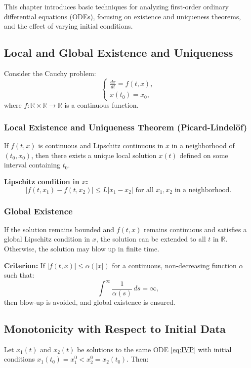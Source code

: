 
This chapter introduces basic techniques for analyzing first-order ordinary differential equations (ODEs), focusing on existence and uniqueness theorems, and the effect of varying initial conditions.

\subsection*{Local and Global Existence and Uniqueness}
Consider the Cauchy problem:
\begin{equation} \label{eq:IVP}
\begin{cases}
\displaystyle \frac{dx}{dt} = f(t, x), \\
x(t_0) = x_0,
\end{cases}
\end{equation}
where $f: \mathbb{R} \times \mathbb{R} \to \mathbb{R}$ is a continuous function.

\subsubsection*{Local Existence and Uniqueness Theorem (Picard-Lindel\"of)}
If $f(t, x)$ is continuous and Lipschitz continuous in $x$ in a neighborhood of $(t_0, x_0)$, then there exists a unique local solution $x(t)$ defined on some interval containing $t_0$.

\textbf{Lipschitz condition in $x$:}
\[|f(t, x_1) - f(t, x_2)| \leq L |x_1 - x_2| \text{ for all } x_1, x_2 \text{ in a neighborhood.}\]

\subsubsection*{Global Existence}
If the solution remains bounded and $f(t,x)$ remains continuous and satisfies a global Lipschitz condition in $x$, the solution can be extended to all $t$ in $\mathbb{R}$. Otherwise, the solution may blow up in finite time.

\textbf{Criterion:} If $|f(t,x)| \leq \alpha(|x|)$ for a continuous, non-decreasing function $\alpha$ such that:
\[\int^\infty \frac{1}{\alpha(s)}\, ds = \infty,\]
then blow-up is avoided, and global existence is ensured.

\subsection*{Monotonicity with Respect to Initial Data}
Let $x_1(t)$ and $x_2(t)$ be solutions to the same ODE \eqref{eq:IVP} with initial conditions $x_1(t_0) = x_1^0 < x_2^0 = x_2(t_0)$. Then:

